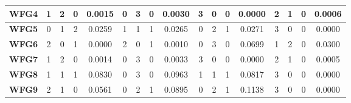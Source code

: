 \begin{table*}[t]
{\begin{tabular}{c|c|c|c|c|c|c|c|c|c|c|c|c|c|c|c|c|}
\multicolumn{1}{|c|}{\textbf{WFG4}}  & 1                   & 2                     & 0                          & 0.0015          & 0                   & 3                     & 0                          & 0.0030          & 3                   & 0                     & 0                          & 0.0000          & 2                   & 1                     & 0                          & 0.0006          \\ \hline
\multicolumn{1}{|c|}{\textbf{WFG5}}  & 0                   & 1                     & 2                          & 0.0259          & 1                   & 1                     & 1                          & 0.0265          & 0                   & 2                     & 1                          & 0.0271          & 3                   & 0                     & 0                          & 0.0000          \\ \hline
\multicolumn{1}{|c|}{\textbf{WFG6}}  & 2                   & 0                     & 1                          & 0.0000          & 2                   & 0                     & 1                          & 0.0010          & 0                   & 3                     & 0                          & 0.0699          & 1                   & 2                     & 0                          & 0.0300          \\ \hline
\multicolumn{1}{|c|}{\textbf{WFG7}}  & 1                   & 2                     & 0                          & 0.0014          & 0                   & 3                     & 0                          & 0.0033          & 3                   & 0                     & 0                          & 0.0000          & 2                   & 1                     & 0                          & 0.0005          \\ \hline
\multicolumn{1}{|c|}{\textbf{WFG8}}  & 1                   & 1                     & 1                          & 0.0830          & 0                   & 3                     & 0                          & 0.0963          & 1                   & 1                     & 1                          & 0.0817          & 3                   & 0                     & 0                          & 0.0000          \\ \hline
\multicolumn{1}{|c|}{\textbf{WFG9}}  & 2                   & 1                     & 0                          & 0.0561          & 0                   & 2                     & 1                          & 0.0895          & 0                   & 2                     & 1                          & 0.1138          & 3                   & 0                     & 0                          & 0.0000          \\ \hline

\end{tabular}}
\end{table*}
